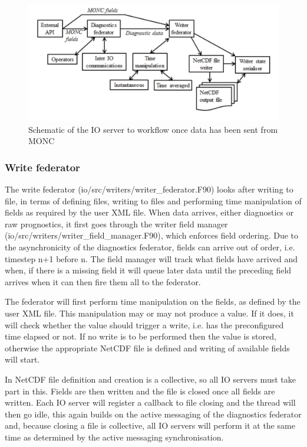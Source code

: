 \documentclass[a4paper,11pt]{article}
\begin{document}
\begin{figure}
  \centering
\includegraphics[scale=0.3]{IOserver_architecture_workflow.png}
\caption{Schematic of the IO server to workflow once data has been sent from MONC}
\label{fig:ioserver_workflow}
\end{figure}

\subsubsection{Write federator}

The write federator (io/src/writers/writer\_federator.F90) looks after
writing to file, in terms of defining files, writing to files and performing
time manipulation of fields as required by the user XML file. When data arrives,
either diagnostics or raw prognostics, it first goes through the writer field
manager (io/src/writers/writer\_field\_manager.F90), which enforces field
ordering. Due to the asynchronicity of the diagnostics federator, fields can
arrive out of order, i.e. timestep n+1 before n. The field manager will track
what fields have arrived and when, if there is a missing field it will queue
later data until the preceding field arrives when it can then fire them all to
the federator.

The federator will first perform time manipulation on the fields,
as defined by the user XML file. This manipulation may or may not produce a
value. If it does, it will check whether the value should trigger a write, i.e.
has the preconfigured time elapsed or not. If no write is to be performed then
the value is stored, otherwise the appropriate NetCDF file is defined and
writing of available fields will start.

In NetCDF file definition and creation is a collective, so all IO servers must
take part in this. Fields are then written and the file is closed once all
fields are written. Each IO server will register a callback to file closing
and the thread will then go idle, this again builds on the active messaging of
the diagnostics federator and, because closing a file is collective, all IO
servers will perform it at the same time as determined by the active messaging
synchronisation.
\end{document}
